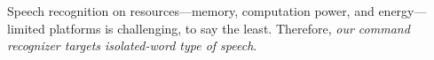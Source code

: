 Speech recognition on resources---memory, computation power, and energy---limited platforms is challenging, to say the least. Therefore, \emph{our command recognizer targets isolated-word type of speech}. 



















